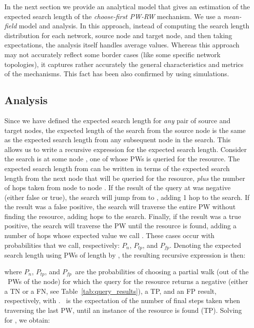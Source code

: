 \documentclass[]{elsarticle}
\newcommand{\pn} 	{\ensuremath{P_n}}
\newcommand{\ps} 	{\ensuremath{P_{\!t\!p}}}
\newcommand{\pf} 	{\ensuremath{P_{\!f\!p}}}
\begin{document}
In the next section we provide an analytical model that gives an estimation of the expected search length of the \emph{choose-first PW-RW} mechanism. We use a \emph{mean-field} model and analysis. In this approach, instead of computing the search length distribution for each network, source node and target node, and then taking expectations, the analysis itself handles average values. Whereas this approach may not accurately reflect some border cases (like some specific network topologies), it captures rather accurately the general characteristics and metrics of the mechanisms. This fact has been also confirmed by using simulations.

\subsection{Analysis}
\label{subsec:analysis}

Since we have defined the expected search length for \emph{any} pair of source and target nodes, 
the expected length of the search from the source node is the same as the expected search length from any subsequent node in the search. This allows us to write a recursive expression for the expected search length. Consider the search is at some node , one of whose PWs is queried for the resource. The expected search length from  can be written in terms of the expected search length from the next node  that will be queried for the resource, \emph{plus} the number of hops taken from node  to node . If the result of the query at  was negative (either false or true), the search will jump from  to , adding 1 hop to the search. If the result was a false positive, the search will traverse the entire PW without finding the resource, adding  hops to the search. Finally, if the result was a true positive, the search will traverse the PW until the resource is found, adding a number of hops whose expected value we call . These cases occur with probabilities that we call, respectively: \pn, \ps, and \pf.
Denoting the expected search length using PWs of length  by \Lsexp, the resulting recursive expression is then:


\noindent
where \pn, \ps, and \pf\ are the probabilities of choosing a partial walk (out of the \w\ PWs of the node) for which the query for the resource returns a negative (either a TN or a FN, see Table~\ref{tab:query_results}), a TP, and an FP result, respectively, with . \Texp\ is the expectation of the number of final steps taken when traversing the last PW, until an instance of the resource is found (TP).
Solving for \Lsexp, we obtain:
\end{document}
